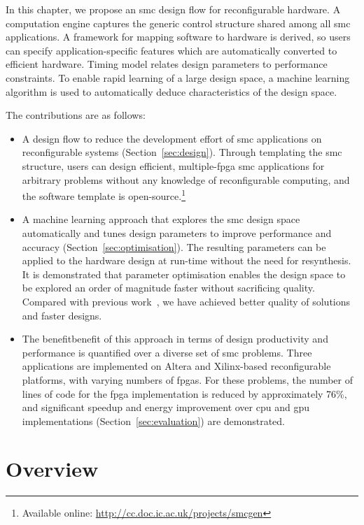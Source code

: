 In this chapter, we propose an \gls{smc} design flow for reconfigurable hardware.
A computation engine captures the generic control structure shared among all \gls{smc} applications.
A framework for mapping software to hardware is derived, so users can specify application-specific features which are automatically converted to efficient hardware. 
Timing model relates design parameters to performance constraints.
To enable rapid learning of a large design space, a machine learning algorithm is used to automatically deduce characteristics of the design space.

The contributions are as follows:
\begin{itemize}
\item A design flow to reduce the development effort of \gls{smc} applications on reconfigurable systems (Section~\ref{sec:design}). Through templating the \gls{smc} structure, users can design efficient, multiple-\gls{fpga} \gls{smc} applications for arbitrary problems without any knowledge of reconfigurable computing, and the software template is open-source.\footnote{Available online: \url{http://cc.doc.ic.ac.uk/projects/smcgen}}
\item A machine learning approach that explores the \gls{smc} design space automatically and tunes design parameters to improve performance and accuracy (Section~\ref{sec:optimisation}). The resulting parameters can be applied to the hardware design at run-time without the need for resynthesis.
It is demonstrated that parameter optimisation enables the design space to be explored an order of magnitude faster without sacrificing quality.
Compared with previous work~\cite{chau13a,chau13b}, we have achieved better quality of solutions and faster designs.
\item The benefitbenefit  of this approach in terms of design productivity and performance is quantified over a diverse set of \gls{smc} problems.
Three applications are implemented on Altera and Xilinx-based reconfigurable platforms, with varying numbers of \gls{fpga}s. For these problems, the number of lines of code for the \gls{fpga} implementation is reduced by approximately 76\%, and 
significant speedup and energy improvement over \gls{cpu} and \gls{gpu} implementations (Section~\ref{sec:evaluation}) are demonstrated.
\end{itemize}


\section{Overview}
\label{sec:overview}

